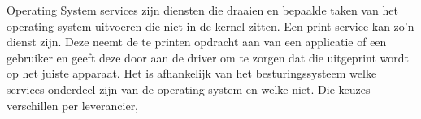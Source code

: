 Operating System services zijn diensten die draaien en bepaalde taken van het operating system uitvoeren die niet in de kernel zitten. Een print service kan zo'n dienst zijn. Deze neemt de te printen opdracht aan van een applicatie of een gebruiker en geeft deze door aan de driver om te zorgen dat die uitgeprint wordt op het juiste apparaat. Het is afhankelijk van het besturingssysteem welke services onderdeel zijn van de operating system en welke niet. Die keuzes verschillen per leverancier,

